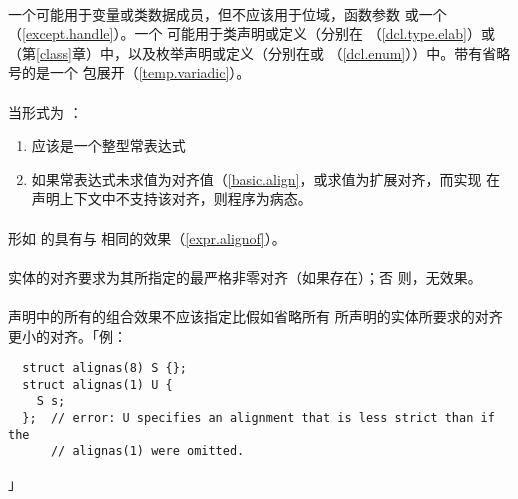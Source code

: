 \paragraph{}
一个可能用于变量或类数据成员，但不应该用于位域，函数参数
或一个（\ref{except.handle}）。一个
可能用于类声明或定义（分别在
（\ref{dcl.type.elab}）或
（第\ref{class}章）中，以及枚举声明或定义（分别在或
（\ref{dcl.enum}））中。带有省略号的是一个
包展开（\ref{temp.variadic}）。

\paragraph{}
当形式为  \tm{)}：
\begin{enumerate}
  \item{应该是一个整型常表达式}
  \item{如果常表达式未求值为对齐值（\ref{basic.align}，或求值为扩展对齐，而实现
    在声明上下文中不支持该对齐，则程序为病态。}
\end{enumerate}

\paragraph{}
形如  \tm{)}的具有与
  \tm{))}相同的效果（\ref{expr.alignof}）。

\paragraph{}
实体的对齐要求为其所指定的最严格非零对齐（如果存在）；否
则，无效果。

\paragraph{}
声明中的所有的组合效果不应该指定比假如省略所有
所声明的实体所要求的对齐更小的对齐。「例：
\begin{lstlisting}
  struct alignas(8) S {};
  struct alignas(1) U {
    S s;
  };  // error: U specifies an alignment that is less strict than if the
      // alignas(1) were omitted.
\end{lstlisting}」

